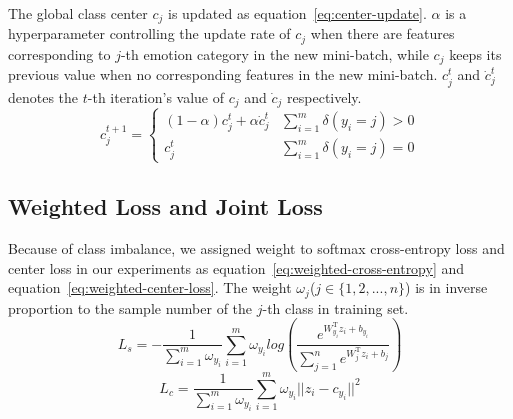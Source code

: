 \documentclass{article}
\begin{document}
The global class center $c_j$ is updated as equation~\ref{eq:center-update}. $\alpha$ is a hyperparameter controlling the update rate of $c_j$ when there are features corresponding to $j$-th emotion category in the new mini-batch, while $c_j$ keeps its previous value when no corresponding features in the new mini-batch. $c^t_j$ and $\dot{c}^t_j$ denotes the $t$-th iteration's value of  $c_j$ and $\dot{c}_j$ respectively.
\begin{equation} \label{eq:center-update}
c_j^{t+1}=\left\{
\begin{array}{lr}
(1 - \alpha) c_j^t + \alpha \dot{c}^t_j & \sum_{i=1}^{m}\delta(y_i = j) > 0 \\
c_j^t & \sum_{i=1}^{m}\delta(y_i = j) = 0
\end{array}
\right.
\end{equation}
\subsection{Weighted Loss and Joint Loss}

Because of class imbalance, we assigned weight to softmax cross-entropy loss and center loss in our experiments as equation~\ref{eq:weighted-cross-entropy} and equation~\ref{eq:weighted-center-loss}. The weight $\omega_j$($j \in \{1, 2, ... , n\}$)  is  in inverse proportion to the sample number of the $j$-th class in training set.
\begin{equation} \label{eq:weighted-cross-entropy}
L_s = - \frac{1}{\sum_{i=1}^{m}\omega_{y_i}}\sum_{i=1}^{m}{\omega_{y_i}log(\frac{e^{W_{y_i}^\mathrm{T}z_i+b_{y_i}}}{\sum_{j=1}^{n}e^{W_j^\mathrm{T}z_i+b_j}})}
\end{equation}
\begin{equation} \label{eq:weighted-center-loss}
L_c=\frac{1}{\sum_{i=1}^{m}\omega_{y_i}}\sum_{i=1}^{m}{\omega_{y_i}||z_i - c_{y_i}||^2}
\end{equation}
\end{document}

